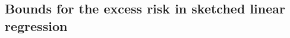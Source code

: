 \documentclass[twoside,11pt]{book}
\newtheorem{proposition}{Proposition}
\numberwithin{theorem}{chapter}
\numberwithin{definition}{chapter}
\numberwithin{proposition}{chapter}
\numberwithin{corollary}{chapter}
\numberwithin{example}{chapter}
\numberwithin{lemma}{chapter}
\numberwithin{assumption}{chapter}
\numberwithin{equation}{chapter}
\numberwithin{figure}{chapter}
\DeclareMathOperator{\Fr}{\mathrm{Fr}}
\begin{document}


\subsection{Bounds for the excess risk in sketched linear regression}
\label{sec:bounds_for_regression_under_dpp}
\end{document}
